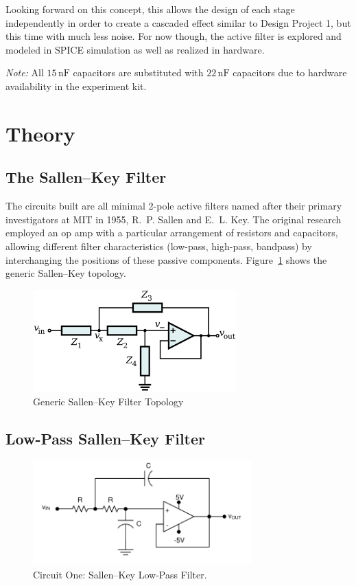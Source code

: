 \documentclass[12pt]{article}
\begin{document}
Looking forward on this concept, this allows the design of each stage
independently in order to create a cascaded effect similar to Design Project 1,
but this time with much less noise. For now though, the active filter is
explored and modeled in SPICE simulation as well as realized in hardware.

\emph{Note:} All $15\,\mathrm{nF}$ capacitors are substituted with
$22\,\mathrm{nF}$ capacitors due to hardware availability in the experiment kit.

\section{Theory}

\subsection{The Sallen--Key Filter}

The circuits built are all minimal 2-pole active filters named after their
primary investigators at MIT in 1955, R.~P. Sallen and E.~L. Key. The original
research employed an op amp with a particular arrangement of resistors and
capacitors, allowing different filter characteristics (low-pass, high-pass,
bandpass) by interchanging the positions of these passive components.
Figure~\ref{fig:gensallen} shows the generic Sallen--Key topology.

\begin{figure}[H]
	\centering
	\includegraphics[width=0.7\textwidth]{07_sallen}
	\caption{Generic Sallen--Key Filter Topology}
	\label{fig:gensallen}
\end{figure}

\subsection{Low-Pass Sallen--Key Filter}

\begin{figure}[H]
	\centering
	\includegraphics[width=0.75\textwidth]{07_lowpass}
	\caption{Circuit One: Sallen--Key Low-Pass Filter.}
	\label{fig:lowpass}
\end{figure}
\end{document}
